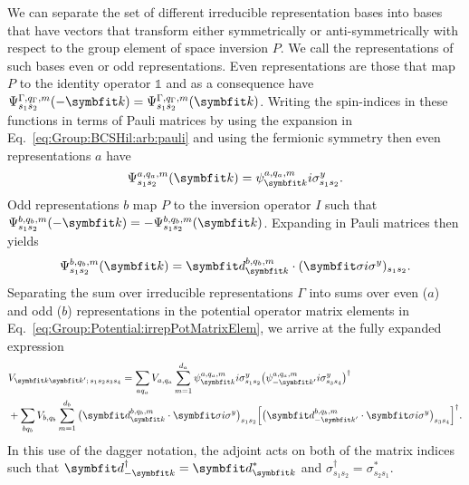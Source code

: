 We can separate the set of different irreducible representation bases into bases that have vectors that transform either symmetrically or anti-symmetrically
with respect to the group element of space inversion $P$. We call the representations of such bases even or odd representations. Even representations are those that map
$P$ to the identity operator $\mathbb{1}$ and as a consequence have $\Psi^{\Gamma,q_\Gamma,m}_{s_1s_2}(-\v{k}) = \Psi^{\Gamma,q_\Gamma,m}_{s_1s_2}(\v{k})$. Writing
the spin-indices in these functions in terms of Pauli matrices by using the expansion in Eq.~\eqref{eq:Group:BCSHil:arb:pauli} and using the fermionic symmetry then
even representations $a$ have
\begin{equation}
    \label{eq:Group:Potential:evenIrrepFunctions}
    \Psi^{a,q_a,m}_{s_1s_2}(\v{k}) = \psi^{a,q_a,m}_\v{k}i\sigma^y_{s_1s_2}.
\end{equation}
Odd representations $b$ map $P$ to the inversion operator $I$ such that $\Psi^{b,q_b,m}_{s_1s_2}(-\v{k}) = -\Psi^{b,q_b,m}_{s_1s_2}(\v{k})$. Expanding in Pauli
matrices then yields
\begin{equation}
    \label{eq:Group:Potential:oddIrrepFunctions}
    \Psi^{b,q_b,m}_{s_1s_2}(\v{k}) = \v{d}^{b,q_b,m}_{\v{k}}\cdot(\v{\sigma}i\sigma^y)_{s_1s_2}.
\end{equation}
Separating the sum over irreducible representations $\Gamma$ into sums over even ($a$) and odd ($b$) representations in the potential operator matrix elements in
Eq.~\eqref{eq:Group:Potential:irrepPotMatrixElem}, we arrive at the fully expanded expression
\begin{equation}
    \label{eq:Group:Potential:fullyExpandedPotMatrixElem}
    \begin{split}
        &V_{\v{k}\v{k}';\,s_1s_2s_3s_4} = \sum_{aq_a}V_{a,q_a}\sum_{m=1}^{d_a}\psi_\v{k}^{a,q_a,m}i\sigma^y_{s_1s_2}\big(\psi_{-\v{k}'}^{a,q_a,m}i\sigma^y_{s_3s_4}\big)^\dagger\\
        & + \sum_{bq_b}V_{b,q_b}\sum_{m=1}^{d_b}\big(\v{d}^{b,q_b,m}_{\v{k}}\cdot\v{\sigma}i\sigma^y\big)_{s_1s_2}\Big[\big(\v{d}^{b,q_b,m}_{-\v{k}'}\cdot\v{\sigma}i\sigma^y\big)_{s_3s_4}\Big]^\dagger.
    \end{split}
\end{equation}
In this use of the dagger notation, the adjoint acts on both of the matrix indices such that $\v{d}_{-\v{k}}^\dagger = \v{d}_\v{k}^\ast$ and $\sigma_{s_1s_2}^\dagger = \sigma_{s_2s_1}^\ast$.
